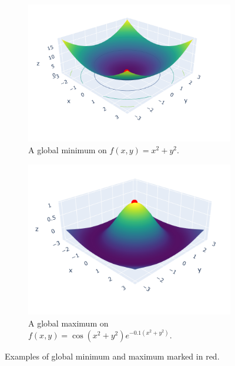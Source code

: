 \begin{figure}[h]
    \begin{subfigure}[b]{0.48\linewidth}
        \centering
        \includegraphics[width=\linewidth]{figures/2background/glob_min.png}
        \caption{A global minimum on $f(x,y) = x^2 + y^2$.}
        \label{fig:global_min}
    \end{subfigure}
    \hfill
    \begin{subfigure}[b]{0.48\linewidth}
        \centering
        \includegraphics[width=\linewidth]{figures/2background/glob_max.png}
        \caption{A global maximum on \\
        $f(x,y) = \cos(x^2 + y^2) e^{-0.1 (x^2 + y^2)}$.}
        \label{fig:global_max}
    \end{subfigure}
    \caption{Examples of global minimum and maximum marked in red.}
    \label{fig:global_min_max}
\end{figure}

